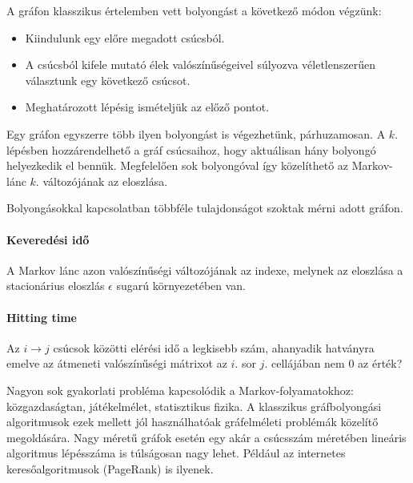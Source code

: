 A gráfon klasszikus értelemben vett bolyongást a következő módon végzünk:
\begin{itemize}
  \item Kiindulunk egy előre megadott csúcsból.
  \item A csúcsból kifele mutató élek valószínűségeivel súlyozva véletlenszerűen
        választunk egy következő csúcsot.
  \item Meghatározott lépésig ismételjük az előző pontot.
\end{itemize}

Egy gráfon egyszerre több ilyen bolyongást is végezhetünk, párhuzamosan. A
$k.$ lépésben hozzárendelhető a gráf csúcsaihoz, hogy aktuálisan hány bolyongó
helyezkedik el bennük. Megfelelően sok bolyongóval így közelíthető az Markov-lánc
$k.$ változójának az eloszlása.

Bolyongásokkal kapcsolatban többféle tulajdonságot szoktak mérni adott gráfon.

\paragraph{Keveredési idő} A Markov lánc azon valószínűségi változójának
az indexe, melynek az eloszlása a stacionárius eloszlás $\epsilon$ sugarú környezetében
van.

\paragraph{Hitting time} Az $i \rightarrow j$ csúcsok
közötti elérési idő a legkisebb szám, ahanyadik hatványra emelve az
átmeneti valószínűségi mátrixot az $i.$ sor $j.$ cellájában nem 0 az érték?

Nagyon sok gyakorlati probléma kapcsolódik a Markov-folyamatokhoz:
közgazdaságtan, játékelmélet, statisztikus fizika. A klasszikus gráfbolyongási
algoritmusok ezek mellett jól használhatóak gráfelméleti problémák közelítő
megoldására. Nagy méretű gráfok esetén egy akár a csúcsszám méretében lineáris
algoritmus lépésszáma is túlságosan nagy lehet. Például az internetes
keresőalgoritmusok (PageRank) is ilyenek.

